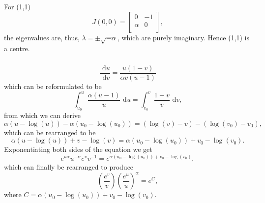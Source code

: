 \documentclass[]{article}
\newcommand{\bb}{\begin{equation}}
\newcommand{\ee}{\end{equation}}
\newcommand{\rd}{\text{ d}}
\renewcommand{\l}{\left(}
\renewcommand{\r}{\right)}
\begin{document}
\begin{Answ}
For (1,1)
\bb
J(0,0)=\left[ {\begin{array}{cc}
   0 & -1 \\
   \alpha & 0 \\
  \end{array} } \right],
\ee
the eigenvalues are, thus, $\lambda=\pm\sqrt{-\alpha}$, which are purely imaginary. Hence (1,1) is a centre.
\subsubsection{}
\bb
\frac{\rd u}{\rd v}=\frac{u\l 1-v\r}{\alpha v\l u-1\r}
\ee
which can be reformulated to be
\bb
\int^u_{u_0}\frac{\alpha(u-1)}{u}\rd u=\int^v_{v_0}\frac{1-v}{v}\rd v,
\ee
from which we can derive
\bb
\alpha(u-\log(u))-\alpha(u_0-\log(u_0))=(\log(v)-v)-(\log(v_0)-v_0),
\ee
which can be rearranged to be
\bb
\alpha(u-\log(u))+v-\log(v)=\alpha(u_0-\log(u_0))+v_0-\log(v_0).
\ee
Exponentiating both sides of the equation we get
\bb
e^{u\alpha}u^{-\alpha}e^{v}v^{-1}=e^{\alpha(u_0-\log(u_0))+v_0-\log(v_0)},
\ee
which can finally be rearranged to produce
\bb
\l\frac{e^{v}}{v}\r\l\frac{e^{u}}{u}\r^\alpha=e^{C},\label{Conserved}
\ee
where $C=\alpha(u_0-\log(u_0))+v_0-\log(v_0)$.
\end{Answ}
\end{document}
